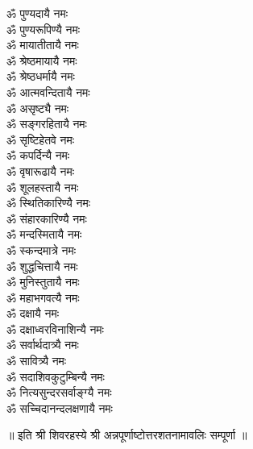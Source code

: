 \begin{multicols}{2}
\begin{flushleft}
ॐ पुण्यदायै नमः\\
ॐ पुण्यरूपिण्यै नमः\\
ॐ मायातीतायै नमः\\
ॐ श्रेष्ठमायायै नमः\\
ॐ श्रेष्ठधर्मायै नमः\\
ॐ आत्मवन्दितायै नमः\\
ॐ असृष्ट्यै नमः\\
ॐ सङ्गरहितायै नमः\hfill{}\\
ॐ सृष्टिहेतवे नमः\\
ॐ कपर्दिन्यै नमः\\
ॐ वृषारूढायै नमः\\
ॐ शूलहस्तायै नमः\\
ॐ स्थितिकारिण्यै नमः\\
ॐ संहारकारिण्यै नमः\\
ॐ मन्दस्मितायै नमः\\
ॐ स्कन्दमात्रे नमः\\
ॐ शुद्धचित्तायै नमः\\
ॐ मुनिस्तुतायै नमः\hfill{}\\
ॐ महाभगवत्यै नमः\\
ॐ दक्षायै नमः\\
ॐ दक्षाध्वरविनाशिन्यै नमः\\
ॐ सर्वार्थदात्र्यै नमः\\
ॐ सावित्र्यै नमः\\
ॐ सदाशिवकुटुम्बिन्यै नमः\\
ॐ नित्यसुन्दरसर्वाङ्ग्यै नमः\\
ॐ सच्चिदानन्दलक्षणायै नमः\\
\end{flushleft}
\end{multicols}
\centerline{॥ इति श्री शिवरहस्ये श्री अन्नपूर्णाष्टोत्तरशतनामावलिः सम्पूर्णा ॥}
